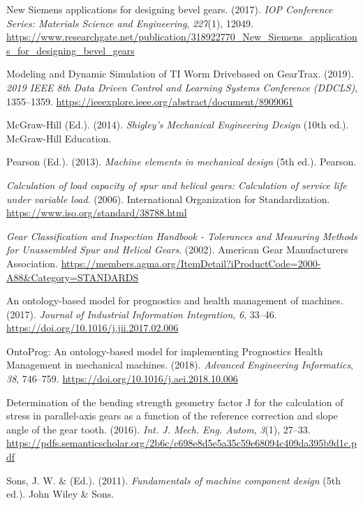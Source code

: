 \documentclass[12pt,a4paper]{article}
\begin{document}
\label{csl:18}{New Siemens applications for designing bevel gears}. (2017). \textit{IOP Conference Series: Materials Science and Engineering}, \textit{227}(1), 12049. \url{https://www.researchgate.net/publication/318922770_New_Siemens_applications_for_designing_bevel_gears}

\label{csl:19}{Modeling and Dynamic Simulation of TI Worm Drivebased on GearTrax}. (2019). \textit{2019 IEEE 8th Data Driven Control and Learning Systems Conference (DDCLS)}, 1355–1359. \url{https://ieeexplore.ieee.org/abstract/document/8909061}

\label{csl:20}McGraw-Hill (Ed.). (2014). \textit{{Shigley’s Mechanical Engineering Design}} (10th ed.). McGraw-Hill Education.

\label{csl:21}Pearson (Ed.). (2013). \textit{{Machine elements in mechanical design}} (5th ed.). Pearson.

\label{csl:22}\textit{{Calculation of load capacity of spur and helical gears: Calculation of service life under variable load}}. (2006). International Organization for Standardization. \url{https://www.iso.org/standard/38788.html}

\label{csl:23}\textit{{Gear Classification and Inspection Handbook - Tolerances and Measuring Methods for Unassembled Spur and Helical Gears}}. (2002). American Gear Manufacturers Association. \url{https://members.agma.org/ItemDetail?iProductCode=2000-A88\&Category=STANDARDS}

\label{csl:24}{An ontology-based model for prognostics and health management of machines}. (2017). \textit{Journal of Industrial Information Integration}, \textit{6}, 33–46. \url{https://doi.org/10.1016/j.jii.2017.02.006}

\label{csl:25}{{OntoProg}: An ontology-based model for implementing Prognostics Health Management in mechanical machines}. (2018). \textit{Advanced Engineering Informatics}, \textit{38}, 746–759. \url{https://doi.org/10.1016/j.aei.2018.10.006}

\label{csl:26}{Determination of the bending strength geometry factor J for the calculation of stress in parallel-axis gears as a function of the reference correction and slope angle of the gear tooth}. (2016). \textit{Int. J. Mech. Eng. Autom}, \textit{3}(1), 27–33. \url{https://pdfs.semanticscholar.org/2b6c/c698e8d5e5a35c59e68094c409da395b9d1c.pdf}

\label{csl:27}Sons, J. W. \& (Ed.). (2011). \textit{{Fundamentals of machine component design}} (5th ed.). John Wiley \& Sons.
\end{document}
